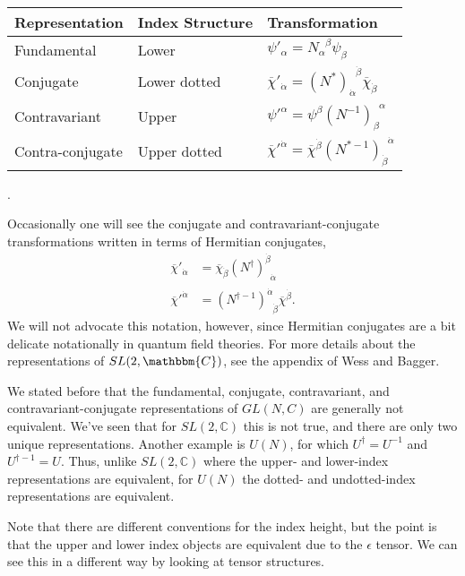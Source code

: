 \begin{center}
    \begin{tabular}{|lll|}
        \hline
        \textbf{Representation} & \textbf{Index Structure} & \textbf{Transformation}\\
        \hline
        Fundamental & Lower & $\psi'_\alpha = N_\alpha^{\phantom\alpha\beta}\psi_\beta$\\
        Conjugate & Lower dotted & $\overline\chi'_{\dot\alpha} = (N^*)_{\dot\alpha}^{\phantom\alpha\dot\beta}\overline\chi_{\dot\beta}$\\
        Contravariant & Upper & $   \psi'^\alpha = \psi^\beta(N^{-1})_\beta^{\phantom\beta\alpha}$\\
        Contra-conjugate & Upper dotted & $\overline\chi'^{\dot\alpha} = \overline\chi^{\dot\beta}(N^{*-1})_{\dot\beta}^{\phantom\beta\dot\alpha}$\\
        \hline
    \end{tabular}.  
\end{center}
Occasionally one will see the conjugate and contravariant-conjugate transformations written in terms of Hermitian conjugates,
\begin{align}
    \overline\chi'_{\dot\alpha} &= \overline\chi_{\dot\beta}(N^\dag)_{\phantom\beta\dot\alpha}^{\dot\beta}\label{eq:SUSYalg:reps:2p}\\
    \overline\chi'^{\dot\alpha} &= (N^{\dag-1})_{\phantom\alpha\dot\beta}^{\dot\alpha}\overline\chi^{\dot\beta}.\label{eq:SUSYalg:reps:4p}
\end{align}
We will not advocate this notation, however, since Hermitian conjugates are a bit delicate notationally in quantum field theories. For more details about the representations of $SL(2,\mathbbm{C})$, see the appendix of Wess and Bagger\autocite{Wess:1992cp}.
\begin{example}
We stated before that the fundamental, conjugate, contravariant, and contravariant-conjugate representations of $GL(N,C)$ are generally not equivalent. We've seen that for $SL(2,\mathbb{C})$ this is not true, and there are only two unique representations. Another example is $U(N)$, for which $U^\dag = U^{-1}$ and $U^{\dag-1} = U$. Thus, unlike $SL(2,\mathbb{C})$ where the upper- and lower-index representations are equivalent, for $U(N)$ the dotted- and undotted-index representations are equivalent.
\end{example}
Note that there are different conventions for the index height, but the point is that the upper and lower index objects are equivalent due to the $\epsilon$ tensor. We can see this in a different way by looking at tensor structures. %


